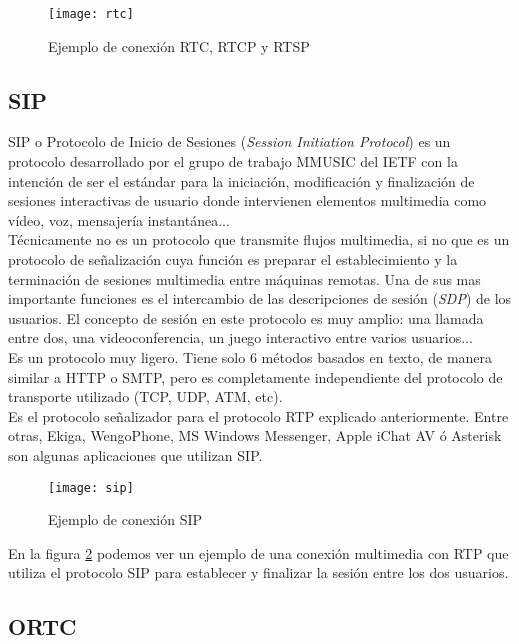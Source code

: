 \begin{figure}[htb]
\centering
\texttt{[image: rtc]}
\caption{Ejemplo de conexión RTC, RTCP y RTSP}
\label{fig:rtc}
\end{figure}


\subsection{SIP}

SIP o Protocolo de Inicio de Sesiones (\emph{Session Initiation Protocol}) es un protocolo desarrollado por el grupo de trabajo MMUSIC del IETF con la intención de ser el estándar para la iniciación, modificación y finalización de sesiones interactivas de usuario donde intervienen elementos multimedia como vídeo, voz, mensajería instantánea...\\

Técnicamente no es un protocolo que transmite flujos multimedia, si no que es un protocolo de señalización cuya función es preparar el establecimiento y la terminación de sesiones multimedia entre máquinas remotas. Una de sus mas importante funciones es el intercambio de las descripciones de sesión (\emph{SDP}) de los usuarios. El concepto de sesión en este protocolo es muy amplio: una llamada entre dos, una videoconferencia, un juego interactivo entre varios usuarios...\\

Es un protocolo muy ligero. Tiene solo 6 métodos basados en texto, de manera similar a HTTP o SMTP, pero es completamente independiente del protocolo de transporte utilizado (TCP, UDP, ATM, etc). \\

Es el protocolo señalizador para el protocolo RTP explicado anteriormente. Entre otras, Ekiga, WengoPhone, MS Windows Messenger, Apple iChat AV ó Asterisk son algunas aplicaciones que utilizan SIP.\\


\begin{figure}[htb]
\centering
\texttt{[image: sip]}
\caption{Ejemplo de conexión SIP}
\label{fig:sip}
\end{figure}

En la figura \ref{fig:sip} podemos ver un ejemplo de una conexión multimedia con RTP que utiliza el protocolo SIP para establecer y finalizar la sesión entre los dos usuarios.\\

\subsection{ORTC}

